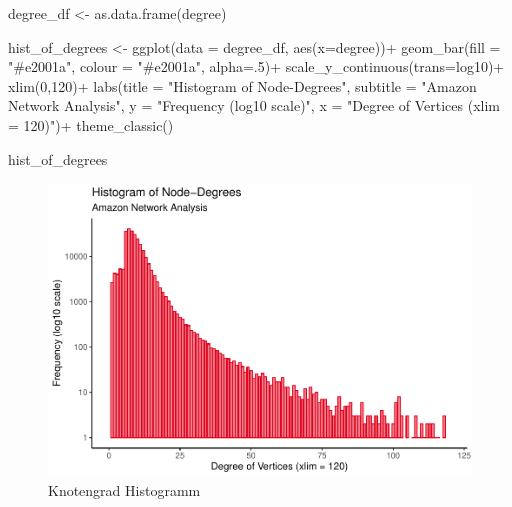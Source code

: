 \documentclass[
  12 pt,
]{article}
\newenvironment{Shaded}{\begin{snugshade}}{\end{snugshade}}
\newcommand{\AttributeTok}[1]{\textcolor[rgb]{0.77,0.63,0.00}{#1}}
\newcommand{\DecValTok}[1]{\textcolor[rgb]{0.00,0.00,0.81}{#1}}
\newcommand{\FunctionTok}[1]{\textcolor[rgb]{0.00,0.00,0.00}{#1}}
\newcommand{\NormalTok}[1]{#1}
\newcommand{\OtherTok}[1]{\textcolor[rgb]{0.56,0.35,0.01}{#1}}
\newcommand{\SpecialCharTok}[1]{\textcolor[rgb]{0.00,0.00,0.00}{#1}}
\newcommand{\StringTok}[1]{\textcolor[rgb]{0.31,0.60,0.02}{#1}}
\begin{document}
\begin{Shaded}
\begin{Highlighting}[]
\NormalTok{degree\_df }\OtherTok{\textless{}{-}} \FunctionTok{as.data.frame}\NormalTok{(degree)}


\NormalTok{hist\_of\_degrees }\OtherTok{\textless{}{-}} \FunctionTok{ggplot}\NormalTok{(}\AttributeTok{data =}\NormalTok{ degree\_df, }\FunctionTok{aes}\NormalTok{(}\AttributeTok{x=}\NormalTok{degree))}\SpecialCharTok{+}
  \FunctionTok{geom\_bar}\NormalTok{(}\AttributeTok{fill =} \StringTok{"\#e2001a"}\NormalTok{, }\AttributeTok{colour =} \StringTok{"\#e2001a"}\NormalTok{, }\AttributeTok{alpha=}\NormalTok{.}\DecValTok{5}\NormalTok{)}\SpecialCharTok{+}
  \FunctionTok{scale\_y\_continuous}\NormalTok{(}\AttributeTok{trans=}\StringTok{\textquotesingle{}log10\textquotesingle{}}\NormalTok{)}\SpecialCharTok{+}
  \FunctionTok{xlim}\NormalTok{(}\DecValTok{0}\NormalTok{,}\DecValTok{120}\NormalTok{)}\SpecialCharTok{+}
  \FunctionTok{labs}\NormalTok{(}\AttributeTok{title =} \StringTok{"Histogram of Node{-}Degrees"}\NormalTok{, }
       \AttributeTok{subtitle =} \StringTok{"Amazon Network Analysis"}\NormalTok{, }
       \AttributeTok{y =} \StringTok{"Frequency (log10 scale)"}\NormalTok{, }
       \AttributeTok{x =} \StringTok{"Degree of Vertices (xlim = 120)"}\NormalTok{)}\SpecialCharTok{+}
  \FunctionTok{theme\_classic}\NormalTok{()}

\NormalTok{hist\_of\_degrees}
\end{Highlighting}
\end{Shaded}

\begin{figure}
\centering
\includegraphics{Assignment_files/figure-latex/viz-1.pdf}
\caption{Knotengrad Histogramm}
\end{figure}
\end{document}
